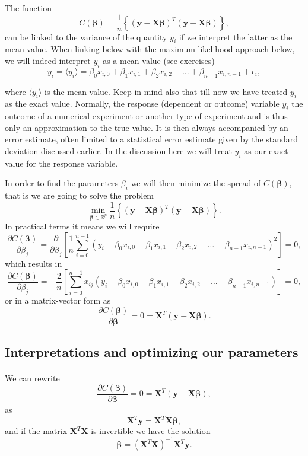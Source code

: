 \documentclass[%
oneside,                 %
final,                   %
10pt]{article}
\begin{document}
The function 
\[
C(\bm{\beta})=\frac{1}{n}\left\{\left(\bm{y}-\bm{X}\bm{\beta}\right)^T\left(\bm{y}-\bm{X}\bm{\beta}\right)\right\},
\]
can be linked to the variance of the quantity $y_i$ if we interpret the latter as the mean value. 
When linking below with the maximum likelihood approach below, we will indeed interpret $y_i$ as a mean value (see exercises)
\[
y_{i}=\langle y_i \rangle = \beta_0x_{i,0}+\beta_1x_{i,1}+\beta_2x_{i,2}+\dots+\beta_{n-1}x_{i,n-1}+\epsilon_i,
\]

where $\langle y_i \rangle$ is the mean value. Keep in mind also that
till now we have treated $y_i$ as the exact value. Normally, the
response (dependent or outcome) variable $y_i$ the outcome of a
numerical experiment or another type of experiment and is thus only an
approximation to the true value. It is then always accompanied by an
error estimate, often limited to a statistical error estimate given by
the standard deviation discussed earlier. In the discussion here we
will treat $y_i$ as our exact value for the response variable.

In order to find the parameters $\beta_i$ we will then minimize the spread of $C(\bm{\beta})$, that is we are going to solve the problem
\[
{\displaystyle \min_{\bm{\beta}\in
{\mathbb{R}}^{p}}}\frac{1}{n}\left\{\left(\bm{y}-\bm{X}\bm{\beta}\right)^T\left(\bm{y}-\bm{X}\bm{\beta}\right)\right\}.
\]
In practical terms it means we will require
\[
\frac{\partial C(\bm{\beta})}{\partial \beta_j} = \frac{\partial }{\partial \beta_j}\left[ \frac{1}{n}\sum_{i=0}^{n-1}\left(y_i-\beta_0x_{i,0}-\beta_1x_{i,1}-\beta_2x_{i,2}-\dots-\beta_{n-1}x_{i,n-1}\right)^2\right]=0, 
\]
which results in
\[
\frac{\partial C(\bm{\beta})}{\partial \beta_j} = -\frac{2}{n}\left[ \sum_{i=0}^{n-1}x_{ij}\left(y_i-\beta_0x_{i,0}-\beta_1x_{i,1}-\beta_2x_{i,2}-\dots-\beta_{n-1}x_{i,n-1}\right)\right]=0, 
\]
or in a matrix-vector form as
\[
\frac{\partial C(\bm{\beta})}{\partial \bm{\beta}} = 0 = \bm{X}^T\left( \bm{y}-\bm{X}\bm{\beta}\right).  
\]




\subsection*{Interpretations and optimizing our parameters}

\paragraph{}
We can rewrite
\[
\frac{\partial C(\bm{\beta})}{\partial \bm{\beta}} = 0 = \bm{X}^T\left( \bm{y}-\bm{X}\bm{\beta}\right),  
\]
as
\[
\bm{X}^T\bm{y} = \bm{X}^T\bm{X}\bm{\beta},  
\]
and if the matrix $\bm{X}^T\bm{X}$ is invertible we have the solution
\[
\bm{\beta} =\left(\bm{X}^T\bm{X}\right)^{-1}\bm{X}^T\bm{y}.
\]
\end{document}
